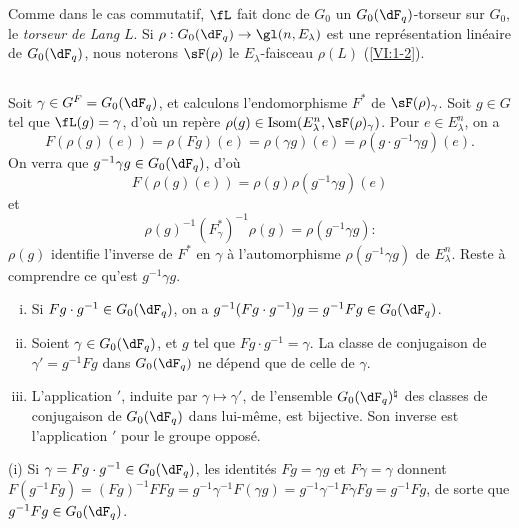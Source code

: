 Comme dans le cas commutatif, $\fL$ fait donc de $G_0$ un $G_0(\dF_q)$-torseur 
sur $G_0$, le \emph{torseur de Lang} $L$. Si 
$\rho:G_0(\dF_q) \to \gl(n,E_\lambda)$ est une représentation linéaire de 
$G_0(\dF_q)$, nous noterons $\sF(\rho)$ le $E_\lambda$-faisceau $\rho(L)$ 
(\ref{VI:1-2}). 





\subsection{}\label{VI:1-23}

Soit $\gamma\in G^F=G_0(\dF_q)$, et calculons l'endomorphisme $F^\ast$ de 
$\sF(\rho)_\gamma$. Soit $g\in G$ tel que $\fL(g)=\gamma$, d'où un repère 
$\rho(g)\in \operatorname{Isom}(E_\lambda^n,\sF(\rho)_\gamma)$. Pour 
$e\in E_\lambda^n$, on a 
\[
  F(\rho(g)(e)) = \rho(F g)(e) = \rho(\gamma g)(e) = \rho(g\cdot g^{-1}\gamma g)(e) \text{.}
\]
On verra que $g^{-1} \gamma g\in G_0(\dF_q)$, d'où 
\[
  F(\rho(g)(e)) = \rho(g) \rho(g^{-1}\gamma g)(e)
\]
et 
\begin{equation*}\tag{1.23.1}\label{VI:eq:1-23-1}
  \rho(g)^{-1} (F_\gamma^\ast)^{-1} \rho(g) = \rho(g^{-1} \gamma g) \text{:}
\end{equation*}
$\rho(g)$ identifie l'inverse de $F^\ast$ en $\gamma$ à l'automorphisme 
$\rho(g^{-1} \gamma g)$ de $E_\lambda^n$. Reste à comprendre ce qu'est 
$g^{-1} \gamma g$. 





\begin{lemma_}\label{VI:1-24}
\begin{enumerate}[(i)]
  \item Si $F g\cdot g^{-1} \in G_0(\dF_q)$, on a 
    $g^{-1} (F g\cdot g^{-1}) g = g^{-1} F g\in G_0(\dF_q)$.
  \item Soient $\gamma\in G_0(\dF_q)$, et $g$ tel que 
    $F g\cdot g^{-1} = \gamma$. La classe de conjugaison de $\gamma'=g^{-1} Fg$ 
    dans $G_0(\dF_q)$ ne dépend que de celle de $\gamma$. 
  \item L'application $\prime$, induite par $\gamma\mapsto \gamma'$, de l'ensemble 
    $G_0(\dF_q)^\natural$ des classes de conjugaison de $G_0(\dF_q)$ dans 
    lui-même, est bijective. Son inverse est l'application $\prime$ pour le groupe 
    opposé. 
\end{enumerate}
\end{lemma_}

(i) Si $\gamma= F g\cdot g^{-1}\in G_0(\dF_q)$, les identités $F g=\gamma g$ 
et 
$F\gamma=\gamma$ donnent $F(g^{-1} F g) = (F g)^{-1} F F g = g^{-1} \gamma^{-1} F(\gamma g) = g^{-1} \gamma^{-1} F \gamma F g = g^{-1} F g$, 
de sorte que $g^{-1} F g \in G_0(\dF_q)$. 

